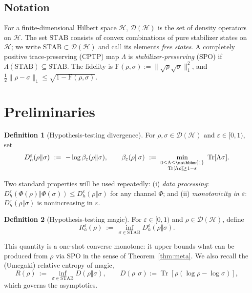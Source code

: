 \documentclass[11pt]{article}
\theoremstyle{definition}
\newtheorem{definition}{Definition}
\DeclareMathOperator{\Tr}{Tr}
\newcommand{\id}{\mathbbm{1}}
\newcommand{\calH}{\mathcal{H}}
\newcommand{\calD}{\mathcal{D}}
\newcommand{\Dh}[1]{D_h^{#1}}
\newcommand{\F}{\mathrm{F}}
\begin{document}
\subsection*{Notation}
For a finite-dimensional Hilbert space $\calH$, $\calD(\calH)$ is the set of density operators on $\calH$. The set $\mathrm{STAB}$ consists of convex combinations of pure stabilizer states on $\calH$; we write $\mathrm{STAB}\subset\calD(\calH)$ and call its elements \emph{free states}. A completely positive trace-preserving (CPTP) map $\Lambda$ is \emph{stabilizer-preserving} (SPO) if $\Lambda(\mathrm{STAB})\subseteq\mathrm{STAB}$. The fidelity is $\F(\rho,\sigma):=\|\sqrt{\rho}\sqrt{\sigma}\|_1^2$, and $\tfrac12\|\rho-\sigma\|_1\le\sqrt{1-\F(\rho,\sigma)}$.

\section{Preliminaries}
\begin{definition}[Hypothesis-testing divergence]
For $\rho,\sigma\in\calD(\calH)$ and $\varepsilon\in[0,1)$, set
\begin{equation}\label{eq:Dh}
\Dh{\varepsilon}(\rho\Vert\sigma)\ :=\ -\log \beta_\varepsilon(\rho\Vert\sigma),\qquad
\beta_\varepsilon(\rho\Vert\sigma)\ :=\ \min_{\substack{0\le \Lambda \le \id\\ \Tr[\Lambda\rho]\ge 1-\varepsilon}}\ \Tr[\Lambda\sigma].
\end{equation}
\end{definition}
Two standard properties will be used repeatedly: (i) \emph{data processing}: $\Dh{\varepsilon}(\Phi(\rho)\Vert\Phi(\sigma))\le \Dh{\varepsilon}(\rho\Vert\sigma)$ for any channel $\Phi$; and (ii) \emph{monotonicity in $\varepsilon$}: $\Dh{\varepsilon}(\rho\Vert\sigma)$ is nonincreasing in $\varepsilon$.

\begin{definition}[Hypothesis-testing magic]\label{def:Rhe}
For $\varepsilon\in[0,1)$ and $\rho\in\calD(\calH)$, define
\begin{equation}
R_h^{\varepsilon}(\rho)\ :=\ \inf_{\sigma\in \mathrm{STAB}} \Dh{\varepsilon}(\rho\Vert\sigma).
\end{equation}
\end{definition}
This quantity is a one-shot converse monotone: it upper bounds what can be produced from $\rho$ via SPO in the sense of Theorem~\ref{thm:meta}. We also recall the (Umegaki) relative entropy of magic,
\begin{equation}\label{eq:REM}
R(\rho)\ :=\ \inf_{\sigma\in\mathrm{STAB}} D(\rho\Vert\sigma),\qquad
D(\rho\Vert\sigma):=\Tr[\rho(\log\rho-\log\sigma)],
\end{equation}
which governs the asymptotics.
\end{document}

